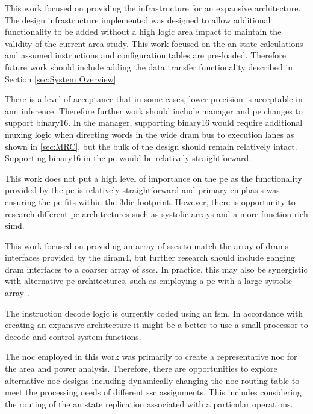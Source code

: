 This work focused on providing the infrastructure for an expansive architecture.
The design infrastructure implemented was designed to allow additional functionality to be added without a high logic area impact to maintain the validity of the current area study.
This work focused on the \ac{an} state calculations and assumed instructions and configuration tables are pre-loaded.
Therefore future work should include adding the data transfer functionality described in Section \ref{sec:System Overview}.

There is a level of acceptance that in some cases, lower precision is acceptable in \ac{ann} inference. Therefore further work should include manager and \ac{pe} changes to support \ac{binary16}.
In the manager, supporting \ac{binary16} would require additional muxing logic when directing words in the wide \ac{dram} bus to execution lanes as shown in \ref{sec:MRC}, but the bulk of the design should remain relatively intact.
Supporting \ac{binary16} in the \ac{pe} would be relatively straightforward.

This work does not put a high level of importance on the \ac{pe} as the functionality provided by the \ac{pe} is relatively straightforward and primary emphasis was ensuring the \ac{pe} fits within the \ac{3dic} footprint.
However, there is opportunity to research different \ac{pe} architectures such as systolic arrays and a more function-rich \ac{simd}.

This work focused on providing an array of \acp{ssc} to match the array of \acp{dram} interfaces provided by the \ac{diram4}, but further research should include ganging \ac{dram} interfaces to a coarser array of \acp{ssc}.
In practice, this may also be synergistic with alternative \ac{pe} architectures, such as employing a \ac{pe} with a large systolic array \cite{jouppi2017datacenter}.

The instruction decode logic is currently coded using an \ac{fsm}.  In accordance with creating an expansive architecture it might be a better to use a small processor to decode and control system functions.

The \ac{noc} employed in this work was primarily to create a representative \ac{noc} for the area and power analysis.
Therefore, there are opportunities to explore alternative \ac{noc} designs including dynamically changing the \ac{noc} routing table to meet the processing needs of different \ac{ssc} assignments.
This includes considering the routing of the \ac{an} state replication associated with a particular operations.

